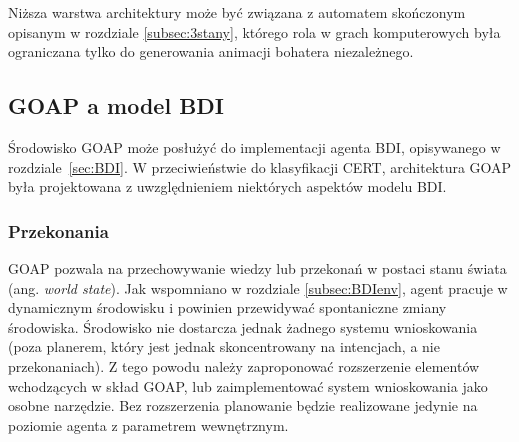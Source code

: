 Niższa warstwa architektury może być związana z automatem skończonym opisanym w rozdziale \ref{subsec:3stany}, którego rola w grach komputerowych była ograniczana tylko do generowania animacji bohatera niezależnego. 






\subsection{GOAP a model BDI}
\label{subsec:GOAP_BDI}
Środowisko GOAP może posłużyć do implementacji agenta BDI, opisywanego w rozdziale~\ref{sec:BDI}. W przeciwieństwie do klasyfikacji CERT, architektura GOAP była projektowana z uwzględnieniem niektórych aspektów modelu BDI.

\subsubsection{Przekonania}
GOAP pozwala na przechowywanie wiedzy lub przekonań w postaci stanu świata (ang. \textit{world state}). Jak wspomniano w rozdziale \ref{subsec:BDIenv}, agent pracuje w dynamicznym środowisku i powinien przewidywać spontaniczne zmiany środowiska. Środowisko nie dostarcza jednak żadnego systemu wnioskowania (poza planerem, który jest jednak skoncentrowany na intencjach, a nie przekonaniach). Z tego powodu należy zaproponować rozszerzenie elementów wchodzących w skład GOAP, lub zaimplementować system wnioskowania jako osobne narzędzie. Bez rozszerzenia planowanie będzie realizowane jedynie na poziomie agenta z parametrem wewnętrznym.

